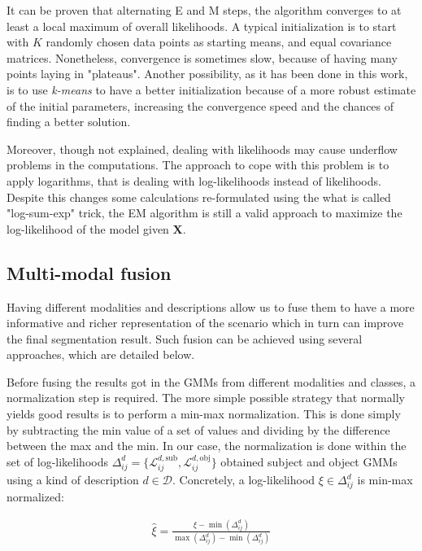 \documentclass[10pt,twocolumn,letterpaper]{article}
\begin{document}
It can be proven that alternating E and M steps, the algorithm converges to at least a local maximum of overall likelihoods. A typical initialization is to start with $K$ randomly chosen data points as starting means, and equal covariance matrices. Nonetheless, convergence is sometimes slow, because of having many points laying in "plateaus". Another possibility, as it has been done in this work, is to use \emph{k-means} to have a better initialization because of a more robust estimate of the initial parameters, increasing the convergence speed and the chances of finding a better solution.

Moreover, though not explained, dealing with likelihoods may cause underflow problems in the computations. The approach to cope with this problem is to apply logarithms, that is dealing with log-likelihoods instead of likelihoods. Despite this changes some calculations re-formulated using the what is called "log-sum-exp" trick, the EM algorithm is still a valid approach to maximize the log-likelihood of the model given $\mathbf{X}$.

\subsection{Multi-modal fusion} 
\label{ssec:fusion}
Having different modalities and descriptions allow us to fuse them to have a more informative and richer representation of the scenario which in turn can improve the final segmentation result. Such fusion can be achieved using several approaches, which are detailed below.  
 
Before fusing the results got in the GMMs from different modalities and classes, a normalization step is required. The more simple possible strategy that normally yields good results is to perform a min-max normalization. This is done simply by subtracting the min value of a set of values and dividing by the difference between the max and the min. In our case, the normalization is done within the set of log-likelihoods $\Delta_{ij}^d = \{\mathcal{L}_{ij}^{d,\mathrm{sub}},\mathcal{L}_{ij}^{d,\mathrm{obj}}\}$ obtained subject and object GMMs using a kind of description $d \in \mathcal{D}$. Concretely, a log-likelihood $\xi \in \Delta_{ij}^d$ is min-max normalized:

\begin{gather}
	\hat{\xi} = \frac{ \xi - \min (\Delta_{ij}^d) } { \max (\Delta_{ij}^d) - \min (\Delta_{ij}^d)}
\end{gather}
\end{document}
